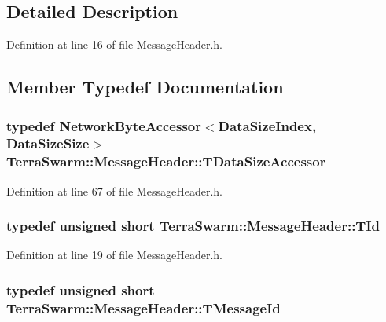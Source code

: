 \subsection{Detailed Description}


Definition at line 16 of file Message\-Header.\-h.



\subsection{Member Typedef Documentation}
\hypertarget{class_terra_swarm_1_1_message_header_aed583369adabf273cabc86e379229537}{
\subsubsection[{T\-Data\-Size\-Accessor}]{\setlength{\rightskip}{0pt plus 5cm}typedef {\bf Network\-Byte\-Accessor}$<${\bf Data\-Size\-Index}, {\bf Data\-Size\-Size}$>$ {\bf Terra\-Swarm\-::\-Message\-Header\-::\-T\-Data\-Size\-Accessor}\hspace{0.3cm}{\ttfamily [private]}}}\label{class_terra_swarm_1_1_message_header_aed583369adabf273cabc86e379229537}


Definition at line 67 of file Message\-Header.\-h.

\hypertarget{class_terra_swarm_1_1_message_header_ab55de822fadad758edcd8f36bd07676e}{
\subsubsection[{T\-Id}]{\setlength{\rightskip}{0pt plus 5cm}typedef unsigned short {\bf Terra\-Swarm\-::\-Message\-Header\-::\-T\-Id}}}\label{class_terra_swarm_1_1_message_header_ab55de822fadad758edcd8f36bd07676e}


Definition at line 19 of file Message\-Header.\-h.

\hypertarget{class_terra_swarm_1_1_message_header_acc3ebce9679077b0e438532be7c7bf6d}{
\subsubsection[{T\-Message\-Id}]{\setlength{\rightskip}{0pt plus 5cm}typedef unsigned short {\bf Terra\-Swarm\-::\-Message\-Header\-::\-T\-Message\-Id}}}\label{class_terra_swarm_1_1_message_header_acc3ebce9679077b0e438532be7c7bf6d}


